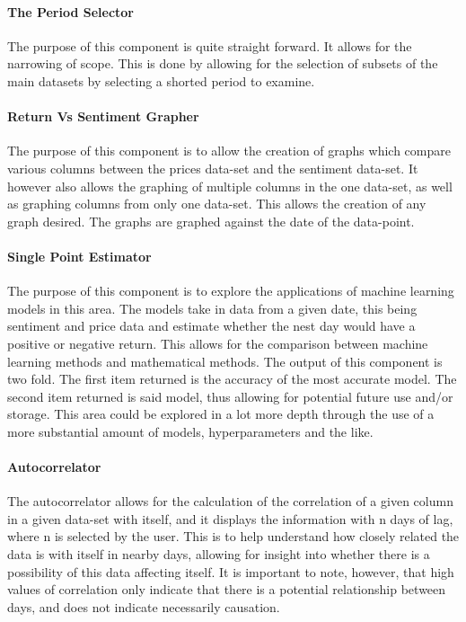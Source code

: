 \paragraph{The Period Selector}

The purpose of this component is quite straight forward. It allows for the narrowing of scope. This is done by allowing for the selection of subsets of the main datasets by selecting a shorted period to examine.

\paragraph{Return Vs Sentiment Grapher}

The purpose of this component is to allow the creation of graphs which compare various columns between the prices data-set and the sentiment data-set. It however also allows the graphing of multiple columns in the one data-set, as well as graphing columns from only one data-set. This allows the creation of any graph desired. The graphs are graphed against the date of the data-point.

\paragraph{Single Point Estimator}

The purpose of this component is to explore the applications of machine learning models in this area. The models take in data from a given date, this being sentiment and price data and estimate whether the nest day would have a positive or negative return. This allows for the comparison between machine learning methods and mathematical methods. The output of this component is two fold. The first item returned is the accuracy of the most accurate model. The second item returned is said model, thus allowing for potential future use and/or storage. This area could be explored in a lot more depth through the use of a more substantial amount of models, hyperparameters and the like.

\paragraph{Autocorrelator}

The autocorrelator allows for the calculation of the correlation of a given column in a given data-set with itself, and it displays the information with n days of lag, where n is selected by the user. This is to help understand how closely related the data is with itself in nearby days, allowing for insight into whether there is a possibility of this data affecting itself. It is important to note, however, that high values of correlation only indicate that there is a potential relationship between days, and does not indicate necessarily causation.


